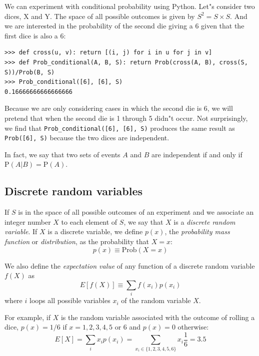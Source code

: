 \documentclass[justified, sixbynine]{tufte-book}
\def\ft{\small\tt}
\theoremstyle{plain}%
\newtheorem * {corollary}{Corollary}
\theoremstyle{definition}
\theoremstyle{remark}
\newtheorem * {remark}{Remark}
\newtheorem * {note}{Note}
\begin{document}
\begin{fullwidth}
We can experiment with conditional probability using Python. Let"s consider two dices, X and Y.
The space of all possible outcomes is given by $S^2 = S \times S$.
And we are interested in the probability of the second die giving a $6$ given that the first dice is also a $6$:

\begin{lstlisting}[caption={in file: {\ft nlib.py}}]
>>> def cross(u, v): return [(i, j) for i in u for j in v]
>>> def Prob_conditional(A, B, S): return Prob(cross(A, B), cross(S, S))/Prob(B, S)
>>> Prob_conditional([6], [6], S)
0.16666666666666666
\end{lstlisting}

Because we are only considering cases in which the second die is 6, we will pretend that when the second die is 1 through 5 didn"t occur.
Not surprisingly, we find that {\ft Prob\_conditional([6], [6], S)} produces the same result as
{\ft Prob([6], S)} because the two dices are independent.

In fact, we say that two sets of events $A$ and $B$ are independent if and only if $\textrm{P}(A|B) = \textrm{P}(A)$.


\goodbreak\subsection{Discrete random variables}

If $S$ is in the space of all possible outcomes of an experiment and we
associate an integer number $X$ to each element of $S$, we say that $X$ is a
{\it discrete random variable}. If $X$ is a discrete variable, we define $%
p(x)$, the {\it probability mass function} or {\it distribution}, as the
probability that $X=x$:
\begin{equation}
p(x) \equiv \textrm{Prob}(X=x)
\end{equation}

We also define the {\it expectation value} of any function of a discrete
random variable $f(X)$ as
\begin{equation}
E[f(X)] \equiv  \sum_i f(x_i)p(x_i)
\end{equation}
where $i$ loops all possible variables $x_i$ of the random variable $X$.

For example, if $X$ is the random variable associated with the outcome of rolling a dice, $p(x)=1/6$ if $x=1, 2, 3, 4, 5$ or $6$ and $p(x)=0$ otherwise:
\begin{equation}
E[X]=\sum_ix_ip(x_i)=\sum_{x_i\in \{1, 2, 3, 4, 5, 6\}}x_i\frac 16=3.5
\end{equation}


\end{fullwidth}
\end{document}
